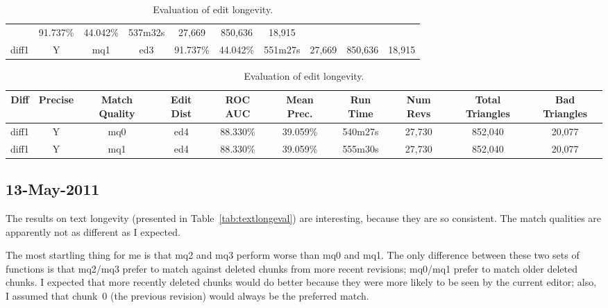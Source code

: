 \begin{sidewaystable}[!tp]
\begin{center}
\begin{tabular}{|c|c|c|c||c|c||c|c|c|c|}
	& 91.737\% & 44.042\%
	& 537m32s & 27,669
	& 850,636 & 18,915 \\
diff1 & Y & mq1 & ed3
	& 91.737\% & 44.042\%
	& 551m27s & 27,669
	& 850,636 & 18,915 \\
\hline
    \end{tabular}
  \end{center}
  \caption{Evaluation of edit longevity.}
\end{sidewaystable}


\begin{sidewaystable}[!tp]
  \begin{center}
    \begin{tabular}{|c|c|c|c||c|c||c|c|c|c|}
\hline
Diff & Precise & Match Quality & Edit Dist
	& ROC AUC & Mean Prec.
	& Run Time & Num Revs
	& Total Triangles & Bad Triangles \\
\hline
\hline
diff1 & Y & mq0 & ed4
	& 88.330\% & 39.059\%
	& 540m27s & 27,730
	& 852,040 & 20,077 \\
diff1 & Y & mq1 & ed4
	& 88.330\% & 39.059\%
	& 555m30s & 27,730
	& 852,040 & 20,077 \\
\hline
    \end{tabular}
  \end{center}
  \caption{Evaluation of edit longevity.}
\end{sidewaystable}

\subsection{13-May-2011}

The results on text longevity
(presented in Table~\ref{tab:textlongeval})
are interesting, because they are so consistent.
The match qualities are apparently not as different
as I expected.

The most startling thing for me is that mq2 and mq3
perform worse than mq0 and mq1.
The only difference between these two sets of functions
is that mq2/mq3 prefer to match against deleted chunks from
more recent revisions; mq0/mq1 prefer to match older deleted chunks.
I expected that more recently deleted chunks would do better
because they were more likely to be seen by the current editor;
also, I assumed that chunk~0 (the previous revision) would always
be the preferred match.

